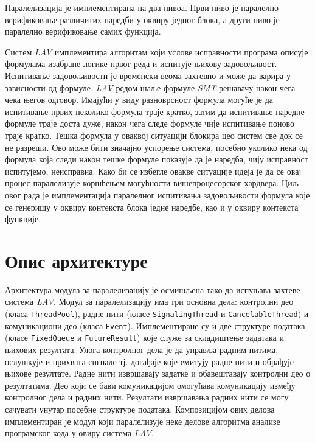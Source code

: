 \documentclass[12pt,oneside]{memoir}
\begin{document}
Паралелизација је имплементирана на два нивоа. Први ниво је паралелно верификовање различитих наредби у оквиру једног блока, а други ниво је паралелно верификовање самих функција.

Систем \textit{LAV} имплементира алгоритам који услове исправности програма описује формулама изабране логике првог реда и испитује њихову задовољивост.  Испитивање задовољивости је  временски веома захтевно и може да варира у зависности од формуле. \textit{LAV} редом шаље формуле \textit{SMT} решавачу након чега чека његов одговор. Имајући у виду разноврсност формула могуће је да испитивање првих неколико формула траје кратко, затим да испитивање наредне формуле траје доста дуже, након чега следе формуле чије испитивање поново траје кратко. Тешка формула у оваквој ситуацији блокира цео систем све док се не разреши. Ово може бити значајно успорење система, посебно уколико нека од формула која следи након тешке формуле показује да је наредба, чију исправност испитујемо, неисправна. 	
Како би се избегле овакве ситуације идеја је да се овај процес паралелизује коршћењем могућности вишепроцесорског хардвера. Циљ овог рада је имплементација паралелног испитивања задовољивости формула које се генеришу у оквиру контекста блока једне наредбе, као и у оквиру контекста функције. 

\section{Опис архитектуре}

Архитектура модула за паралелизацију је осмишљена тако да испуњава захтеве система \textit{LAV}. Модул за паралелизацију има три основна дела: контролни део (класа \texttt{ThreadPool}), радне нити (класе \texttt{SignalingThread} и \texttt{CancelableThread}) и комуникациони део (класа \texttt{Event}). Имплементиране су и две структуре података (класе \texttt{FixedQueue} и \texttt{FutureResult}) које служе за складиштење задатака и њихових резултата. Улога контролног дела је да управља радним нитима, ослушкује и прихвата сигнале тј. догађаје које емитују радне нити и обрађује њихове резултате. Радне нити извршавају задатке и обавештавају контролни део о резултатима. Део који се бави комуникацијом омогућава комуникацију између контролног дела и радних нити. Резултати извршавања радних нити се могу сачувати унутар посебне структуре података. Композицијом ових делова имплементиран је модул који паралелизује неке делове алгоритма анализе програмског кода у овиру система \textit{LAV}. 
\end{document}

